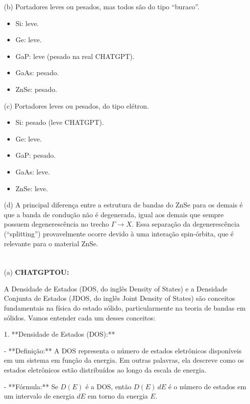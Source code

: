 \documentclass[a4paper,10pt]{article}
\begin{document}
(b) Portadores leves ou pesados, mas todos são do tipo ``buraco''.

\begin{itemize}
\item Si: leve.
\item Ge: leve.
\item GaP: leve (pesado na real CHATGPT).
\item GaAs: pesado.
\item ZnSe: pesado.
\end{itemize}

\n\n

(c) Portadores leves ou pesados, do tipo elétron.

\begin{itemize}
\item Si: pesado (leve CHATGPT).
\item Ge: leve.
\item GaP: pesado.
\item GaAs: leve.
\item ZnSe: leve.
\end{itemize}

\n\n

(d) A principal diferença entre a estrutura de bandas do ZnSe para os demais é que a banda de condução não é degenerada, igual aos demais que sempre possuem degenerescência no trecho $\Gamma \to X$. Essa separação da degenerescência (``splitting'') provavelmente ocorre devido à uma interação spin-órbita, que é relevante para o material ZnSe.

\pagebreak

\section{}

(a) \textbf{CHATGPTOU:}

A Densidade de Estados (DOS, do inglês Density of States) e a Densidade Conjunta de Estados (JDOS, do inglês Joint Density of States) são conceitos fundamentais na física do estado sólido, particularmente na teoria de bandas em sólidos. Vamos entender cada um desses conceitos:

1. **Densidade de Estados (DOS):**

   - **Definição:** A DOS representa o número de estados eletrônicos disponíveis em um sistema em função da energia. Em outras palavras, ela descreve como os estados eletrônicos estão distribuídos ao longo da escala de energia.

   - **Fórmula:** Se \( D(E) \) é a DOS, então \( D(E) \, dE \) é o número de estados em um intervalo de energia \( dE \) em torno da energia \( E \).
\end{document}
